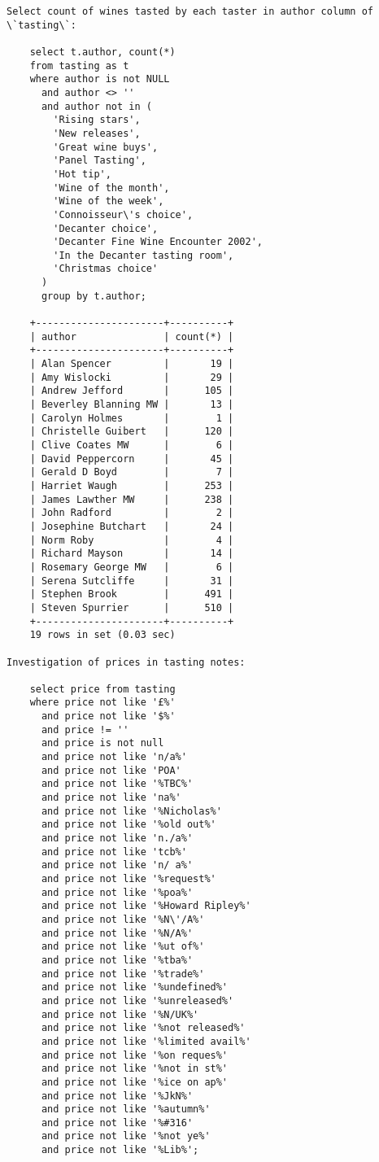 \begin{verbatim}
Select count of wines tasted by each taster in author column of \`tasting\`:

    select t.author, count(*) 
    from tasting as t 
    where author is not NULL 
      and author <> '' 
      and author not in (
        'Rising stars',
        'New releases',
        'Great wine buys',
        'Panel Tasting',
        'Hot tip',
        'Wine of the month',
        'Wine of the week',
        'Connoisseur\'s choice',
        'Decanter choice',
        'Decanter Fine Wine Encounter 2002',
        'In the Decanter tasting room',
        'Christmas choice'
      ) 
      group by t.author;

    +----------------------+----------+
    | author               | count(*) |
    +----------------------+----------+
    | Alan Spencer         |       19 |
    | Amy Wislocki         |       29 |
    | Andrew Jefford       |      105 |
    | Beverley Blanning MW |       13 |
    | Carolyn Holmes       |        1 |
    | Christelle Guibert   |      120 |
    | Clive Coates MW      |        6 |
    | David Peppercorn     |       45 |
    | Gerald D Boyd        |        7 |
    | Harriet Waugh        |      253 |
    | James Lawther MW     |      238 |
    | John Radford         |        2 |
    | Josephine Butchart   |       24 |
    | Norm Roby            |        4 |
    | Richard Mayson       |       14 |
    | Rosemary George MW   |        6 |
    | Serena Sutcliffe     |       31 |
    | Stephen Brook        |      491 |
    | Steven Spurrier      |      510 |
    +----------------------+----------+
    19 rows in set (0.03 sec)

Investigation of prices in tasting notes:

    select price from tasting 
    where price not like '£%' 
      and price not like '$%' 
      and price != '' 
      and price is not null 
      and price not like 'n/a%' 
      and price not like 'POA' 
      and price not like '%TBC%' 
      and price not like 'na%' 
      and price not like '%Nicholas%' 
      and price not like '%old out%' 
      and price not like 'n./a%' 
      and price not like 'tcb%' 
      and price not like 'n/ a%' 
      and price not like '%request%' 
      and price not like '%poa%' 
      and price not like '%Howard Ripley%' 
      and price not like '%N\'/A%' 
      and price not like '%N/A%' 
      and price not like '%ut of%' 
      and price not like '%tba%' 
      and price not like '%trade%' 
      and price not like '%undefined%' 
      and price not like '%unreleased%'
      and price not like '%N/UK%'
      and price not like '%not released%'
      and price not like '%limited avail%'
      and price not like '%on reques%'
      and price not like '%not in st%'
      and price not like '%ice on ap%'
      and price not like '%JkN%'
      and price not like '%autumn%'
      and price not like '%#316'
      and price not like '%not ye%'
      and price not like '%Lib%';
      \end{verbatim}

